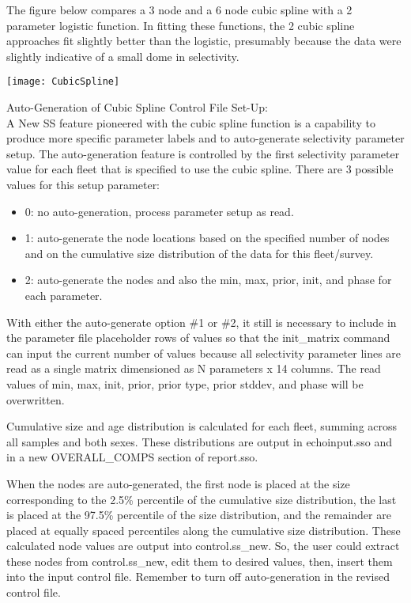 \begin{description}
	
	The figure below compares a 3 node and a 6 node cubic spline with a 2 parameter logistic function.  In fitting these functions, the 2 cubic spline approaches fit slightly better than the logistic, presumably because the data were slightly indicative of a small dome in selectivity.\\
	\begin{center}
		\texttt{[image: CubicSpline]}
	\end{center}
	
	Auto-Generation of Cubic Spline Control File Set-Up:\\
	A New SS feature pioneered with the cubic spline function is a capability to produce more specific parameter labels and to auto-generate selectivity parameter setup.  The auto-generation feature is controlled by the first selectivity parameter value for each fleet that is specified to use the cubic spline.  There are 3 possible values for this setup parameter:
	\begin{itemize}
		\item 0: no auto-generation, process parameter setup as read.
		\item 1: auto-generate the node locations based on the specified number of nodes and on the cumulative size distribution of the data for this fleet/survey.
		\item 2: auto-generate the nodes and also the min, max, prior, init, and phase for each parameter.
	\end{itemize}
	
	With either the auto-generate option \#1 or \#2, it still is necessary to include in the parameter file placeholder rows of values so that the init\_matrix command can input the current number of values because all selectivity parameter lines are read as a single matrix dimensioned as N parameters x 14 columns.  The read values of min, max, init, prior, prior type, prior stddev, and phase will be overwritten.
	
	Cumulative size and age distribution is calculated for each fleet, summing across all samples and both sexes.  These distributions are output in echoinput.sso and in a new OVERALL\_COMPS section of report.sso.
	
	When the nodes are auto-generated, the first node is placed at the size corresponding to the 2.5\% percentile of the cumulative size distribution, the last is placed at the 97.5\% percentile of the size distribution, and the remainder are placed at equally spaced percentiles along the cumulative size distribution.  These calculated node values are output into control.ss\_new.  So, the user could extract these nodes from control.ss\_new, edit them to desired values, then, insert them into the input control file.  Remember to turn off auto-generation in the revised control file.
	

\end{description}
